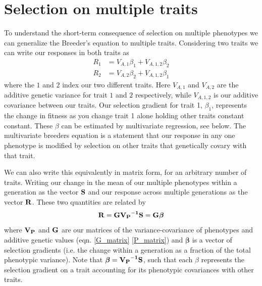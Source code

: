 \section{Selection on multiple traits}
To understand the short-term consequence of selection on multiple
phenotypes we can generalize the Breeder's equation  to multiple traits\cite{lande:79}. Considering two traits we can write our responses in both traits as
\begin{eqnarray}
R_1 & = V_{A,1} \beta_1 + V_{A,1,2} \beta_2 \nonumber \\
R_2 & = V_{A,2} \beta_2 + V_{A,1,2} \beta_1  \label{eqn:2D_breeders_eqn}
\end{eqnarray}
where the $1$ and $2$ index our two different traits. Here $V_{A,1} $
and $ V_{A,2}$ are the additive genetic variance for trait $1$ and $2$
respectively, while $V_{A,1,2}$ is our additive covariance between our
traits. Our selection gradient for trait 1, $\beta_1$, represents the
change in fitness as you change trait 1 alone holding other traits
constant constant. These $\beta$ can be estimated by multivariate
regression, see below. 
The multivariate breeders equation is a statement that our response in
any one phenotype is modified by selection on other traits that
genetically covary with that trait. 

We can also write this equivalently in matrix form, for an arbitrary
number of traits. Writing our change in the mean of our multiple phenotypes within a generation as the vector $\bf{S}$ and our response across multiple generations as
the vector $\bf{R}$. These two quantities are related by 
\begin{equation}
\bf{R} = \bf{G} \bf{V_P}^{-1} \bf{S} = \bf{G} \boldsymbol{ \beta} \label{eqn:MV_breeders_eqn}
\end{equation}
 where $\bf{V_P}$ and $\bf{G}$ are our matrices of the
 variance-covariance of phenotypes and additive genetic values
 (eqn. \eqref{G_matrix} \eqref{P_matrix}) and
 $\boldsymbol{\beta}$ is a vector of selection gradients (i.e. the
 change within a generation as a fraction of the total phenotypic
 variance). Note that $\boldsymbol{\beta} = \bf{V_P}^{-1} \bf{S} $, such
 that each $\beta$ represents the selection gradient on a trait
 accounting for its phenotypic covariances with other traits. 

